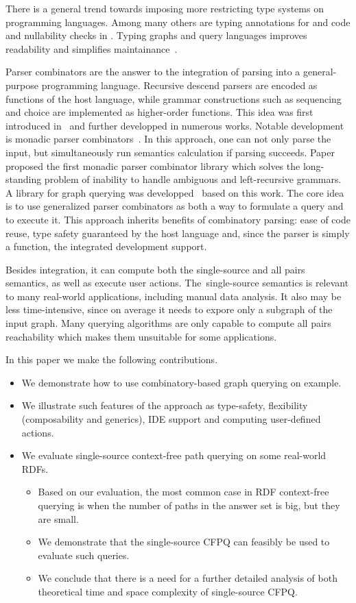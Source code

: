 There is a general trend towards imposing more restricting type systems on programming languages.
Among many others are typing annotations for \python{} and \typescript{} code and nullability checks in \kotlin{}.
Typing graphs and query languages improves  readability and simplifies maintainance~\cite{10.1145/2076623.2076653}.

Parser combinators are the answer to the integration of parsing into a general-purpose programming language.
Recursive descend parsers are encoded as functions of the host language, while grammar constructions such as sequencing and choice are implemented as higher-order functions.
This idea was first introduced in~\cite{burge} and further developped in numerous works.
Notable development is monadic parser combinators~\cite{hutton1996monadic}.
In this approach, one can not only parse the input, but simultaneously run semantics calculation if parsing succeeds.
Paper~\cite{izmaylova2016practical} proposed the first monadic parser combinator library which solves the long-standing problem of inability to handle ambiguous and left-recursive grammars.
A library for graph querying was developped~\cite{10.1145/3241653.3241655} based on this work.
The core idea is to use generalized parser combinators as both a way to formulate a query and to execute it.
This approach inherits benefits of combinatory parsing: ease of code reuse, type safety guaranteed by the host language and, since the parser is simply a function, the integrated development support.

Besides integration, it can compute both the single-source and all pairs semantics, as well as execute user actions.
The~single-source semantics is relevant to many real-world applications, including manual data analysis.
It also may be less time-intensive, since on average it needs to expore only a subgraph of the input graph.
Many querying algorithms are only capable to compute all pairs reachability which makes them unsuitable for some applications.

In this paper we make the following contributions.
\begin{itemize}
  \item We demonstrate how to use combinatory-based graph querying on example.
  \item We illustrate such features of the approach as type-safety, flexibility (composability and generics), IDE support and computing user-defined actions.
  \item We evaluate single-source context-free path querying on some real-world RDFs.
  \begin{itemize}
    \item Based on our evaluation, the most common case in RDF context-free querying is when the number of paths in the answer set is big, but they are small.
    \item We demonstrate that the single-source CFPQ can feasibly be used to evaluate such queries.
    \item We conclude that there is a need for a further detailed analysis of both theoretical time and space complexity of single-source CFPQ.
  \end{itemize}
\end{itemize}
